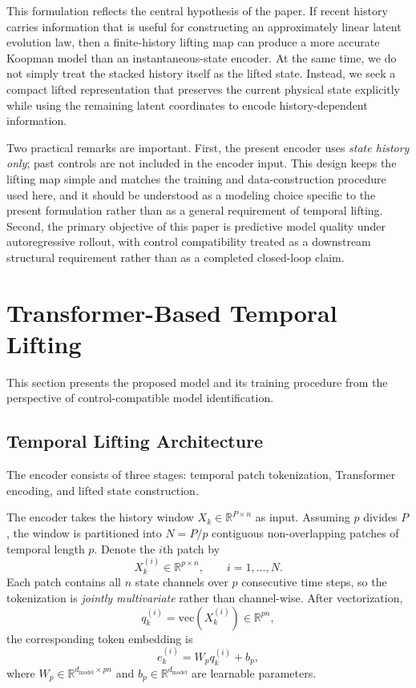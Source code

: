 \documentclass[journal]{IEEEtran}
\begin{document}
This formulation reflects the central hypothesis of the paper. If recent history carries information that is useful for constructing an approximately linear latent evolution law, then a finite-history lifting map can produce a more accurate Koopman model than an instantaneous-state encoder. At the same time, we do not simply treat the stacked history itself as the lifted state. Instead, we seek a compact lifted representation that preserves the current physical state explicitly while using the remaining latent coordinates to encode history-dependent information.

Two practical remarks are important. First, the present encoder uses \emph{state history only}; past controls are not included in the encoder input. This design keeps the lifting map simple and matches the training and data-construction procedure used here, and it should be understood as a modeling choice specific to the present formulation rather than as a general requirement of temporal lifting. Second, the primary objective of this paper is predictive model quality under autoregressive rollout, with control compatibility treated as a downstream structural requirement rather than as a completed closed-loop claim.

\section{Transformer-Based Temporal Lifting}
\label{sec:methodology}

This section presents the proposed model and its training procedure from the perspective of control-compatible model identification.

\subsection{Temporal Lifting Architecture}
\label{sec:temporal_lifting}

The encoder consists of three stages: temporal patch tokenization, Transformer encoding, and lifted state construction.

The encoder takes the history window $X_k \in \mathbb{R}^{P\times n}$ as input. Assuming $p$ divides $P$, the window is partitioned into $N=P/p$ contiguous non-overlapping patches of temporal length $p$. Denote the $i$th patch by
\begin{equation}
    X_k^{(i)} \in \mathbb{R}^{p\times n}, \qquad i=1,\ldots,N.
\end{equation}
Each patch contains all $n$ state channels over $p$ consecutive time steps, so the tokenization is \emph{jointly multivariate} rather than channel-wise. After vectorization,
\begin{equation}
    q_k^{(i)} = \mathrm{vec}(X_k^{(i)}) \in \mathbb{R}^{pn},
\end{equation}
the corresponding token embedding is
\begin{equation}
    e_k^{(i)} = W_p q_k^{(i)} + b_p,
    \label{eq:patch_embedding}
\end{equation}
where $W_p \in \mathbb{R}^{d_{\mathrm{model}}\times pn}$ and $b_p \in \mathbb{R}^{d_{\mathrm{model}}}$ are learnable parameters.
\end{document}
